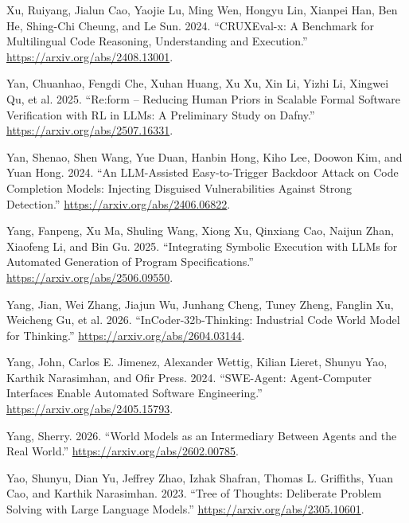 \documentclass{article}
\newlength{\cslhangindent}
\newenvironment{CSLReferences}[2]
 {%
  \setlength{\parindent}{0pt}
  \everypar{\setlength{\hangindent}{\cslhangindent}}\ignorespaces
 }
 {\par}
\begin{document}
\begin{CSLReferences}{1}{0}
\leavevmode{}%
Xu, Ruiyang, Jialun Cao, Yaojie Lu, Ming Wen, Hongyu Lin, Xianpei Han,
Ben He, Shing-Chi Cheung, and Le Sun. 2024. {``CRUXEval-x: A Benchmark
for Multilingual Code Reasoning, Understanding and Execution.''}
\url{https://arxiv.org/abs/2408.13001}.

\leavevmode{}%
Yan, Chuanhao, Fengdi Che, Xuhan Huang, Xu Xu, Xin Li, Yizhi Li, Xingwei
Qu, et al. 2025. {``Re:form -- Reducing Human Priors in Scalable Formal
Software Verification with RL in LLMs: A Preliminary Study on Dafny.''}
\url{https://arxiv.org/abs/2507.16331}.

\leavevmode{}%
Yan, Shenao, Shen Wang, Yue Duan, Hanbin Hong, Kiho Lee, Doowon Kim, and
Yuan Hong. 2024. {``An LLM-Assisted Easy-to-Trigger Backdoor Attack on
Code Completion Models: Injecting Disguised Vulnerabilities Against
Strong Detection.''} \url{https://arxiv.org/abs/2406.06822}.

\leavevmode{}%
Yang, Fanpeng, Xu Ma, Shuling Wang, Xiong Xu, Qinxiang Cao, Naijun Zhan,
Xiaofeng Li, and Bin Gu. 2025. {``Integrating Symbolic Execution with
LLMs for Automated Generation of Program Specifications.''}
\url{https://arxiv.org/abs/2506.09550}.

\leavevmode{}%
Yang, Jian, Wei Zhang, Jiajun Wu, Junhang Cheng, Tuney Zheng, Fanglin
Xu, Weicheng Gu, et al. 2026. {``InCoder-32b-Thinking: Industrial Code
World Model for Thinking.''} \url{https://arxiv.org/abs/2604.03144}.

\leavevmode{}%
Yang, John, Carlos E. Jimenez, Alexander Wettig, Kilian Lieret, Shunyu
Yao, Karthik Narasimhan, and Ofir Press. 2024. {``SWE-Agent:
Agent-Computer Interfaces Enable Automated Software Engineering.''}
\url{https://arxiv.org/abs/2405.15793}.

\leavevmode{}%
Yang, Sherry. 2026. {``World Models as an Intermediary Between Agents
and the Real World.''} \url{https://arxiv.org/abs/2602.00785}.

\leavevmode{}%
Yao, Shunyu, Dian Yu, Jeffrey Zhao, Izhak Shafran, Thomas L. Griffiths,
Yuan Cao, and Karthik Narasimhan. 2023. {``Tree of Thoughts: Deliberate
Problem Solving with Large Language Models.''}
\url{https://arxiv.org/abs/2305.10601}.


\end{CSLReferences}
\end{document}
